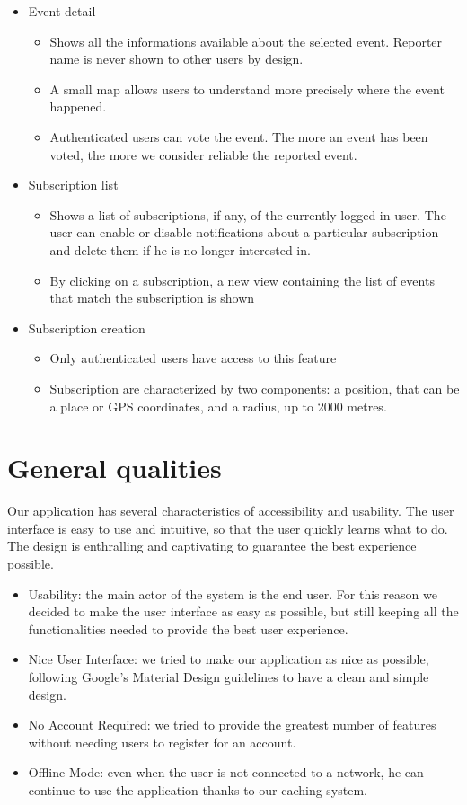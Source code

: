 \documentclass[a4paper]{scrreprt}
\begin{document}
\begin{itemize}
\item Event detail
\begin{itemize}
\item Shows all the informations available about the selected event. Reporter name is never shown to other users by design.
\item A small map allows users to understand more precisely where the event happened.
\item Authenticated users can vote the event. The more an event has been voted, the more we consider reliable the reported event.
\end{itemize}

\pagebreak
\item Subscription list
\begin{itemize}
\item Shows a list of subscriptions, if any, of the currently logged in user. The user can enable or disable notifications about a particular subscription and delete them if he is no longer interested in.
\item By clicking on a subscription, a new view containing the list of events that match the subscription is shown
\end{itemize}

\item Subscription creation
\begin{itemize}
\item Only authenticated users have access to this feature
\item Subscription are characterized by two components: a position, that can be a place or GPS coordinates, and a radius, up to 2000 metres.
\end{itemize}

\end{itemize}

\section{General qualities}
Our application has several characteristics of accessibility and usability. The user interface is easy to use and intuitive, so that the user quickly learns what to do. The design is enthralling and captivating to guarantee the best experience possible.
\begin{itemize}
\item Usability: the main actor of the system is the end user. For this reason we decided to make the user interface as easy as possible, but still keeping all the functionalities needed to provide the best user experience.
\item Nice User Interface: we tried to make our application as nice as possible, following Google's Material Design guidelines to have a clean and simple design.
\item No Account Required: we tried to provide the greatest number of features without needing users to register for an account.
\item Offline Mode: even when the user is not connected to a network, he can continue to use the application thanks to our caching system.
\end{itemize}
\end{document}
